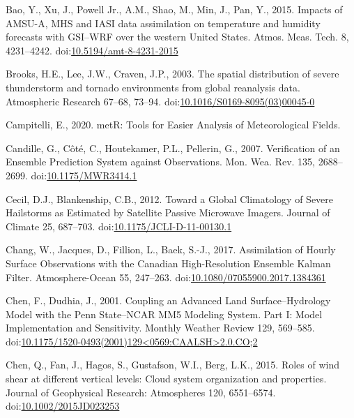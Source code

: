 \documentclass[authoryear,preprint,review,12pt]{elsarticle} %
\begin{document}
\leavevmode\hypertarget{ref-bao2015}{}%
Bao, Y., Xu, J., Powell Jr., A.M., Shao, M., Min, J., Pan, Y., 2015. Impacts of AMSU-A, MHS and IASI data assimilation on temperature and humidity forecasts with GSI--WRF over the western United States. Atmos. Meas. Tech. 8, 4231--4242. doi:\href{https://doi.org/10.5194/amt-8-4231-2015}{10.5194/amt-8-4231-2015}

\leavevmode\hypertarget{ref-brooks2003}{}%
Brooks, H.E., Lee, J.W., Craven, J.P., 2003. The spatial distribution of severe thunderstorm and tornado environments from global reanalysis data. Atmospheric Research 67--68, 73--94. doi:\href{https://doi.org/10.1016/S0169-8095(03)00045-0}{10.1016/S0169-8095(03)00045-0}

\leavevmode\hypertarget{ref-campitelli2020}{}%
Campitelli, E., 2020. metR: Tools for Easier Analysis of Meteorological Fields.

\leavevmode\hypertarget{ref-candille2007}{}%
Candille, G., Côté, C., Houtekamer, P.L., Pellerin, G., 2007. Verification of an Ensemble Prediction System against Observations. Mon. Wea. Rev. 135, 2688--2699. doi:\href{https://doi.org/10.1175/MWR3414.1}{10.1175/MWR3414.1}

\leavevmode\hypertarget{ref-cecil2012}{}%
Cecil, D.J., Blankenship, C.B., 2012. Toward a Global Climatology of Severe Hailstorms as Estimated by Satellite Passive Microwave Imagers. Journal of Climate 25, 687--703. doi:\href{https://doi.org/10.1175/JCLI-D-11-00130.1}{10.1175/JCLI-D-11-00130.1}

\leavevmode\hypertarget{ref-chang2017}{}%
Chang, W., Jacques, D., Fillion, L., Baek, S.-J., 2017. Assimilation of Hourly Surface Observations with the Canadian High-Resolution Ensemble Kalman Filter. Atmosphere-Ocean 55, 247--263. doi:\href{https://doi.org/10.1080/07055900.2017.1384361}{10.1080/07055900.2017.1384361}

\leavevmode\hypertarget{ref-chen2001}{}%
Chen, F., Dudhia, J., 2001. Coupling an Advanced Land Surface--Hydrology Model with the Penn State--NCAR MM5 Modeling System. Part I: Model Implementation and Sensitivity. Monthly Weather Review 129, 569--585. doi:\href{https://doi.org/10.1175/1520-0493(2001)129\%3C0569:CAALSH\%3E2.0.CO;2}{10.1175/1520-0493(2001)129\textless0569:CAALSH\textgreater2.0.CO;2}

\leavevmode\hypertarget{ref-chen2015}{}%
Chen, Q., Fan, J., Hagos, S., Gustafson, W.I., Berg, L.K., 2015. Roles of wind shear at different vertical levels: Cloud system organization and properties. Journal of Geophysical Research: Atmospheres 120, 6551--6574. doi:\href{https://doi.org/10.1002/2015JD023253}{10.1002/2015JD023253}
\end{document}
